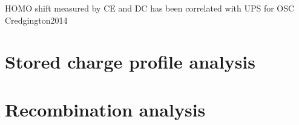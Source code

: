 HOMO shift measured by CE and DC has been correlated with UPS for OSC Credgington2014
%
%
%
%

\section{Stored charge profile analysis}

\section{Recombination analysis}


